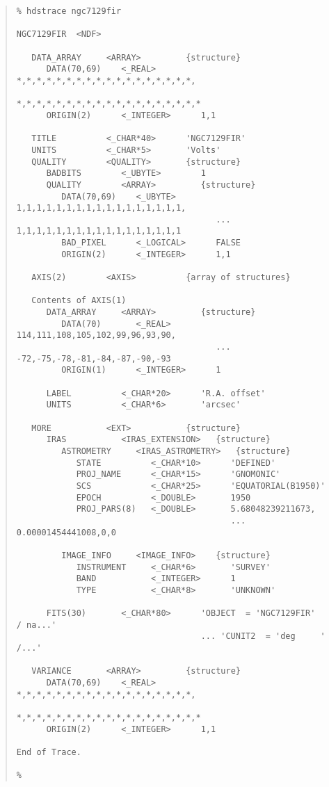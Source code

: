 \documentclass[twoside,11pt]{article}
\newenvironment{myquote}{\begin{quote}\begin{small}}{\end{small}\end{quote}}
\begin{document}
\begin{myquote} \begin{verbatim}
% hdstrace ngc7129fir
 
NGC7129FIR  <NDF>
 
   DATA_ARRAY     <ARRAY>         {structure}
      DATA(70,69)    <_REAL>         *,*,*,*,*,*,*,*,*,*,*,*,*,*,*,*,*,*,
                                     *,*,*,*,*,*,*,*,*,*,*,*,*,*,*,*,*,*,*
      ORIGIN(2)      <_INTEGER>      1,1
 
   TITLE          <_CHAR*40>      'NGC7129FIR'
   UNITS          <_CHAR*5>       'Volts'
   QUALITY        <QUALITY>       {structure}
      BADBITS        <_UBYTE>        1
      QUALITY        <ARRAY>         {structure}
         DATA(70,69)    <_UBYTE>        1,1,1,1,1,1,1,1,1,1,1,1,1,1,1,1,1,
                                        ... 1,1,1,1,1,1,1,1,1,1,1,1,1,1,1,1,1
         BAD_PIXEL      <_LOGICAL>      FALSE
         ORIGIN(2)      <_INTEGER>      1,1
 
   AXIS(2)        <AXIS>          {array of structures}
 
   Contents of AXIS(1)
      DATA_ARRAY     <ARRAY>         {structure}
         DATA(70)       <_REAL>         114,111,108,105,102,99,96,93,90,
                                        ... -72,-75,-78,-81,-84,-87,-90,-93
         ORIGIN(1)      <_INTEGER>      1
 
      LABEL          <_CHAR*20>      'R.A. offset'
      UNITS          <_CHAR*6>       'arcsec'
 
   MORE           <EXT>           {structure}
      IRAS           <IRAS_EXTENSION>   {structure}
         ASTROMETRY     <IRAS_ASTROMETRY>   {structure}
            STATE          <_CHAR*10>      'DEFINED'
            PROJ_NAME      <_CHAR*15>      'GNOMONIC'
            SCS            <_CHAR*25>      'EQUATORIAL(B1950)'
            EPOCH          <_DOUBLE>       1950
            PROJ_PARS(8)   <_DOUBLE>       5.68048239211673,
                                           ... 0.00001454441008,0,0

         IMAGE_INFO     <IMAGE_INFO>    {structure}
            INSTRUMENT     <_CHAR*6>       'SURVEY'
            BAND           <_INTEGER>      1
            TYPE           <_CHAR*8>       'UNKNOWN'

      FITS(30)       <_CHAR*80>      'OBJECT  = 'NGC7129FIR'         / na...'
                                     ... 'CUNIT2  = 'deg     '           /...'
 
   VARIANCE       <ARRAY>         {structure}
      DATA(70,69)    <_REAL>         *,*,*,*,*,*,*,*,*,*,*,*,*,*,*,*,*,*,
                                     *,*,*,*,*,*,*,*,*,*,*,*,*,*,*,*,*,*,*
      ORIGIN(2)      <_INTEGER>      1,1
 
End of Trace.
 
% 
\end{verbatim} \end{myquote}
\end{document}
